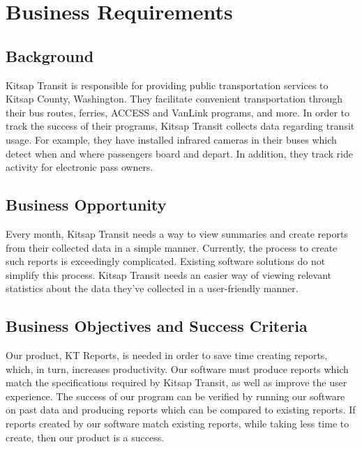 \section{Business Requirements}

\subsection{Background}
Kitsap Transit is responsible for providing public transportation services to Kitsap County, Washington. They facilitate convenient transportation through their bus routes, ferries, ACCESS and VanLink programs, and more. In order to track the success of their programs, Kitsap Transit collects data regarding transit usage. For example, they have installed infrared cameras in their buses which detect when and where passengers board and depart. In addition, they track ride activity for electronic pass owners.

\subsection{Business Opportunity}
Every month, Kitsap Transit needs a way to view summaries and create reports from their collected data in a simple manner. Currently, the process to create such reports is exceedingly complicated. Existing software solutions do not simplify this process. Kitsap Transit needs an easier way of viewing relevant statistics about the data they've collected in a user-friendly manner.

\subsection{Business Objectives and Success Criteria}
Our product, KT Reports, is needed in order to save time creating reports, which, in turn, increases productivity. Our software must produce reports which match the specifications required by Kitsap Transit, as well as improve the user experience. The success of our program can be verified by running our software on past data and producing reports which can be compared to existing reports. If reports created by our software match existing reports, while taking less time to create, then our product is a success.

